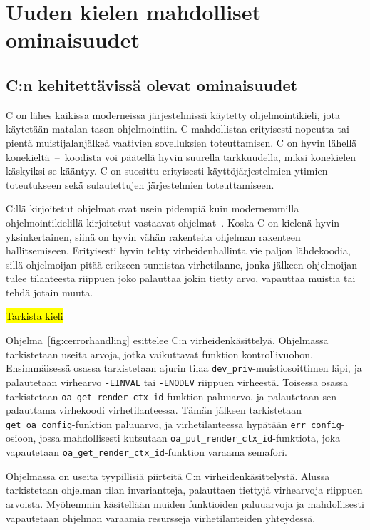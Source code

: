 \section{Uuden kielen mahdolliset ominaisuudet}

\subsection{C:n kehitettävissä olevat ominaisuudet}

C on lähes kaikissa moderneissa järjestelmissä käytetty ohjelmointikieli, jota
käytetään matalan tason ohjelmointiin. C mahdollistaa erityisesti nopeutta tai
pientä muistijalanjälkeä vaativien sovelluksien toteuttamisen. C on hyvin
lähellä konekieltä~--~koodista voi päätellä hyvin suurella tarkkuudella, miksi
konekielen käskyiksi se kääntyy. C on suosittu erityisesti käyttöjärjestelmien
ytimien toteutukseen sekä sulautettujen järjestelmien toteuttamiseen.

C:llä kirjoitetut ohjelmat ovat usein pidempiä kuin modernemmilla
ohjelmointikielillä kirjoitetut vastaavat ohjelmat~\citep{codelength,
qsmcodelength}. Koska C on kielenä hyvin yksinkertainen, siinä on hyvin vähän
rakenteita ohjelman rakenteen hallitsemiseen. Erityisesti hyvin tehty
virheidenhallinta vie paljon lähdekoodia, sillä ohjelmoijan pitää erikseen
tunnistaa virhetilanne, jonka jälkeen ohjelmoijan tulee tilanteesta riippuen
joko palauttaa jokin tietty arvo, vapauttaa muistia tai tehdä jotain muuta.

\hl{Tarkista kieli}

Ohjelma~\ref{fig:cerrorhandling} esittelee C:n virheidenkäsittelyä. Ohjelmassa
tarkistetaan useita arvoja, jotka vaikuttavat funktion kontrollivuohon.
Ensimmäisessä osassa tarkistetaan ajurin tilaa
\texttt{dev\_priv}-muistiosoittimen läpi, ja palautetaan virhearvo
\texttt{-EINVAL} tai \texttt{-ENODEV} riippuen virheestä. Toisessa osassa
tarkistetaan \texttt{oa\_get\_render\_ctx\_id}-funktion paluuarvo, ja
palautetaan sen palauttama virhekoodi virhetilanteessa. Tämän jälkeen
tarkistetaan \texttt{get\_oa\_config}-funktion paluuarvo, ja virhetilanteessa
hypätään \texttt{err\_config}-osioon, jossa mahdollisesti kutsutaan
\texttt{oa\_put\_render\_ctx\_id}-funktiota, joka vapautetaan
\texttt{oa\_get\_render\_ctx\_id}-funktion varaama semafori.

Ohjelmassa on useita tyypillisiä piirteitä C:n virheidenkäsittelystä. Alussa
tarkistetaan ohjelman tilan invariantteja, palauttaen tiettyjä virhearvoja
riippuen arvoista. Myöhemmin käsitellään muiden funktioiden paluuarvoja ja
mahdollisesti vapautetaan ohjelman varaamia resursseja virhetilanteiden
yhteydessä.

